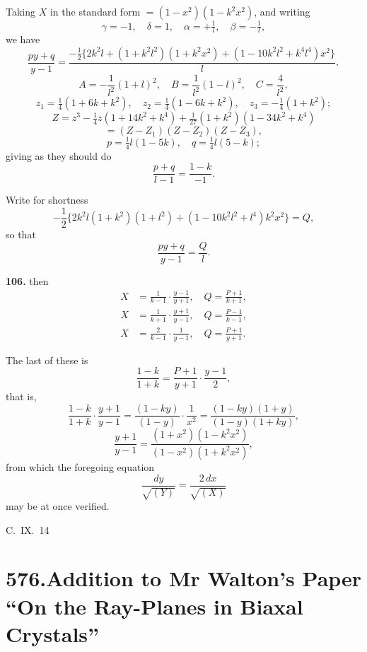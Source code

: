 \documentclass[11pt,a4paper]{book}
\begin{document}
Taking $X$ in the standard form $= (1 - x^2)(1 - k^2x^2)$, and writing
\[
\gamma = -1, \quad \delta = 1, \quad \alpha = +\tfrac{1}{l}, \quad \beta = -\tfrac{1}{l},
\]
we have
\[
\frac{py + q}{y - 1} = \frac{-\frac{1}{2}\{2k^2l + (1 + k^2l^2)(1 + k^2x^2) + (1 - 10k^2l^2 + k^4l^4)x^2\}}{l},
\]
\[
A = -\frac{1}{l^2}(1 + l)^2, \quad B = \frac{1}{l^2}(1 - l)^2, \quad C = \frac{4}{l^2},
\]
\[
z_1 = \tfrac{1}{4}(1 + 6k + k^2), \quad z_2 = \tfrac{1}{4}(1 - 6k + k^2), \quad z_3 = -\tfrac{1}{4}(1 + k^2);
\]
\[
Z = z^3 - \tfrac{1}{4}z(1 + 14k^2 + k^4) + \tfrac{1}{27}(1 + k^2)(1 - 34k^2 + k^4)
\]
\[
= (Z - Z_1)(Z - Z_2)(Z - Z_3),
\]
\[
p = \tfrac{1}{4}l(1 - 5k), \quad q = \tfrac{1}{4}l(5 - k);
\]
giving as they should do
\[
\frac{p + q}{l - 1} = \frac{1 - k}{-1}.
\]

Write for shortness
\[
-\frac{1}{2}\{2k^2l(1 + k^2)(1 + l^2) + (1 - 10k^2l^2 + l^4)k^2x^2\} = Q,
\]
so that
\[
\frac{py + q}{y - 1} = \frac{Q}{l}.
\]

\noindent\textbf{106.} then
\begin{align*}
X &= \frac{1}{k - 1}\cdot\frac{y - 1}{y + 1}, \quad Q = \frac{P + 1}{k + 1}, \\
X &= \frac{1}{k + 1}\cdot\frac{y + 1}{y - 1}, \quad Q = \frac{P - 1}{k - 1}, \\
X &= \frac{2}{k - 1}\cdot\frac{1}{y - 1}, \quad Q = \frac{P + 1}{y + 1}.
\end{align*}

The last of these is
\[
\frac{1 - k}{1 + k} = \frac{P + 1}{y + 1}\cdot\frac{y - 1}{2},
\]
that is,
\[
\frac{1 - k}{1 + k}\cdot\frac{y + 1}{y - 1} = \frac{(1 - ky)}{(1 - y)}\cdot\frac{1}{x^2} = \frac{(1 - ky)(1 + y)}{(1 - y)(1 + ky)},
\]
\[
\frac{y + 1}{y - 1} = \frac{(1 + x^2)(1 - k^2x^2)}{(1 - x^2)(1 + k^2x^2)},
\]
from which the foregoing equation
\[
\frac{dy}{\sqrt{(Y)}} = \frac{2\,dx}{\sqrt{(X)}}
\]
may be at once verified.

\medskip
\begin{flushright}
C.~IX.~14
\end{flushright}


\newpage
\section*{576.\quad Addition to Mr Walton's Paper ``On the Ray-Planes in Biaxal Crystals''}
\end{document}
